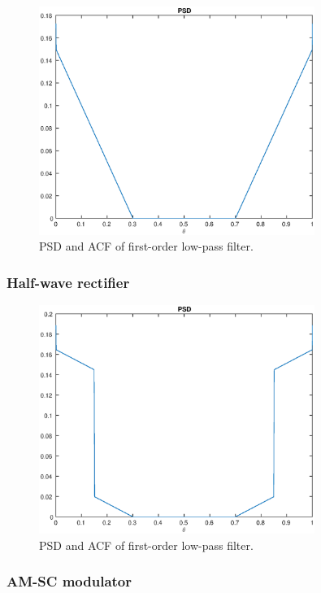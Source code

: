 \documentclass[a4paper,12pt]{article}
\begin{document}
\begin{figure}[h]
\centering
\includegraphics[width=0.8\textwidth]{bilder/Lab2/Lab2fig1.eps}
\caption{PSD and ACF of first-order low-pass filter.}
\label{fig:Lab2fig1}
\end{figure}

\subsubsection{Half-wave rectifier}

\begin{figure}[h]
\centering
\includegraphics[width=0.8\textwidth]{bilder/Lab2/Lab2fig2.eps}
\caption{PSD and ACF of first-order low-pass filter.}
\label{fig:Lab1fig1}
\end{figure}

\subsubsection{AM-SC modulator}
\end{document}
